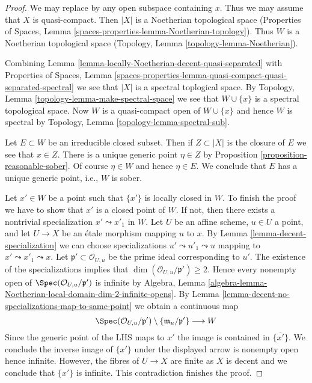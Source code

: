 \begin{proof}
We may replace by any open subspace containing $x$.
Thus we may assume that $X$ is quasi-compact.
Then $|X|$ is a Noetherian topological space
(Properties of Spaces, Lemma \ref{spaces-properties-lemma-Noetherian-topology}).
Thus $W$ is a Noetherian topological space
(Topology, Lemma \ref{topology-lemma-Noetherian}).

\medskip\noindent
Combining Lemma \ref{lemma-locally-Noetherian-decent-quasi-separated} with
Properties of Spaces, Lemma
\ref{spaces-properties-lemma-quasi-compact-quasi-separated-spectral}
we see that $|X|$ is a spectral toplogical space.
By Topology, Lemma \ref{topology-lemma-make-spectral-space}
we see that $W \cup \{x\}$ is a spectral topological space.
Now $W$ is a quasi-compact open of $W \cup \{x\}$ and hence $W$ is
spectral by Topology, Lemma \ref{topology-lemma-spectral-sub}.

\medskip\noindent
Let $E \subset W$ be an irreducible closed subset. Then if $Z \subset |X|$
is the closure of $E$ we see that $x \in Z$. There is a unique generic
point $\eta \in Z$ by Proposition \ref{proposition-reasonable-sober}.
Of course $\eta \in W$ and hence $\eta \in E$. We conclude that $E$
has a unique generic point, i.e., $W$ is sober.

\medskip\noindent
Let $x' \in W$ be a point such that $\{x'\}$ is locally closed in $W$.
To finish the proof we have to show that $x'$ is a closed point of $W$.
If not, then there exists a nontrivial specialization $x' \leadsto x'_1$
in $W$. Let $U$ be an affine scheme, $u \in U$ a point, and let $U \to X$
be an \'etale morphism mapping $u$ to $x$. By
Lemma \ref{lemma-decent-specialization}
we can choose specializations $u' \leadsto u'_1 \leadsto u$
mapping to $x' \leadsto x'_1 \leadsto x$.
Let $\mathfrak p' \subset \mathcal{O}_{U, u}$ be the prime ideal
corresponding to $u'$. The existence of the specializations
implies that $\dim(\mathcal{O}_{U, u}/\mathfrak p') \geq 2$.
Hence every nonempty open of $\Spec(\mathcal{O}_{U, u}/\mathfrak p')$
is infinite by Algebra, Lemma
\ref{algebra-lemma-Noetherian-local-domain-dim-2-infinite-opens}.
By Lemma \ref{lemma-decent-no-specializations-map-to-same-point}
we obtain a continuous map
$$
\Spec(\mathcal{O}_{U, u}/\mathfrak p')
\setminus \{\mathfrak m_u/\mathfrak p'\}
\longrightarrow
W
$$
Since the generic point of the LHS maps to $x'$ the image is
contained in $\overline{\{x'\}}$. We conclude the inverse image of $\{x'\}$
under the displayed arrow is nonempty open hence infinite.
However, the fibres of $U \to X$ are finite as $X$
is decent and we conclude that $\{x'\}$ is infinite.
This contradiction finishes the proof.
\end{proof}






